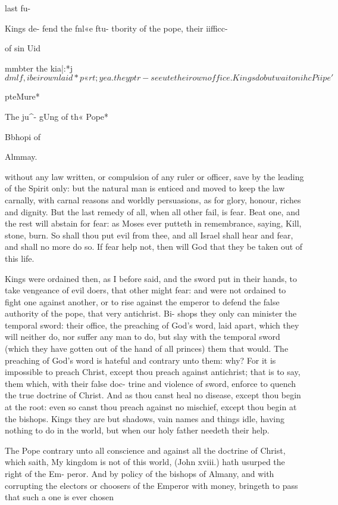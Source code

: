 \documentclass{custom}
\begin{document}
last fu- 

Kings de- 
fend the 
fnl«e ftu- 
tbority of 
the pope, 
their iifficc- 

of sin Uid 

mmbter 
the kia|:*j$ 
dmlf , ibeir 
own laid 
*p«rt ; yea. 
they ptr- 
seeute their 
own office. 

Kings do 
but wait 
on ihc 
Piipe'$ 

pteMure* 

The ju^- 
gUng of 
th« Pope* 

Bbhopi of 

Almmay. 

without any law written, or compulsion of any ruler or 
officer, save by the leading of the Spirit only: but the 
natural man is enticed and moved to keep the law carnally,
with carnal reasons and worldly persuasions, as for glory,
honour, riches and dignity. But the last remedy of all, 
when all other fail, is fear. Beat one, and the rest will 
abstain for fear: as Moses ever putteth in remembrance, 
saying, Kill, stone, burn. So shall thou put evil from 
thee, and all Israel shall hear and fear, and shall no more 
do so. If fear help not, then will God that they be taken 
out of this life. 

Kings were ordained then, as I before said, and the 
sword put in their hands, to take vengeance of evil doers,
that other might fear: and were not ordained to fight one 
against another, or to rise against the emperor to defend 
the false authority of the pope, that very antichrist. Bi- 
shops they only can minister the temporal sword: their 
office, the preaching of God's word, laid apart, which they 
will neither do, nor suffer any man to do, but slay with the 
temporal sword (which they have gotten out of the hand 
of all princes) them that would. The preaching of God's 
word is hateful and contrary unto them: why? For it is 
impossible to preach Christ, except thou preach against 
antichrist; that is to say, them which, with their false doc- 
trine and violence of sword, enforce to quench the true 
doctrine of Christ. And as thou canst heal no disease,
except thou begin at the root: even so canst thou preach 
against no mischief, except thou begin at the bishops. 
Kings they are but shadows, vain names and things idle, 
having nothing to do in the world, but when our holy
father needeth their help. 

The Pope contrary unto all conscience and against all 
the doctrine of Christ, which saith, My kingdom is not of 
this world, (John xviii.) hath usurped the right of the Em- 
peror. And by policy of the bishops of Almany, and 
with corrupting the electors or choosers of the Emperor 
with money, bringeth to pass that such a one is ever chosen 
\end{document}
